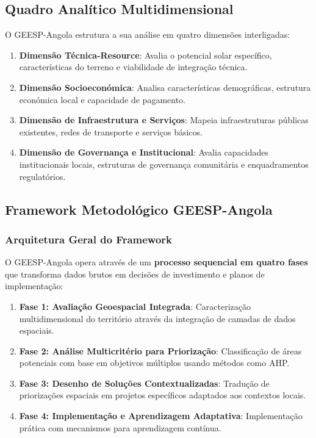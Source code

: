 \documentclass[12pt, a4paper]{article}
\begin{document}
\subsection{Quadro Analítico Multidimensional}

O GEESP-Angola estrutura a sua análise em quatro dimensões interligadas:
\begin{enumerate}
\item \textbf{Dimensão Técnica-Resource}: Avalia o potencial solar específico, características do terreno e viabilidade de integração técnica.
\item \textbf{Dimensão Socioeconómica}: Analisa características demográficas, estrutura económica local e capacidade de pagamento.
\item \textbf{Dimensão de Infraestrutura e Serviços}: Mapeia infraestruturas públicas existentes, redes de transporte e serviços básicos.
\item \textbf{Dimensão de Governança e Institucional}: Avalia capacidades institucionais locais, estruturas de governança comunitária e enquadramentos regulatórios.
\end{enumerate}

\subsection{Framework Metodológico GEESP-Angola}

\subsubsection{Arquitetura Geral do Framework}

O GEESP-Angola opera através de um \textbf{processo sequencial em quatro fases} que transforma dados brutos em decisões de investimento e planos de implementação:

\begin{enumerate}
\item \textbf{Fase 1: Avaliação Geoespacial Integrada}: Caracterização multidimensional do território através da integração de camadas de dados espaciais.
\item \textbf{Fase 2: Análise Multicritério para Priorização}: Classificação de áreas potenciais com base em objetivos múltiplos usando métodos como AHP.
\item \textbf{Fase 3: Desenho de Soluções Contextualizadas}: Tradução de priorizações espaciais em projetos específicos adaptados aos contextos locais.
\item \textbf{Fase 4: Implementação e Aprendizagem Adaptativa}: Implementação prática com mecanismos para aprendizagem contínua.
\end{enumerate}
\end{document}
